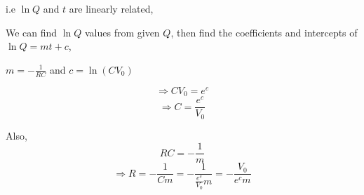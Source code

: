 \documentclass{article}
\begin{document}
i.e $\ln Q$ and $t$ are linearly related,

We can find $\ln Q$ values from given $Q$, then find the coefficients and intercepts of $\ln Q = mt + c$,

$m=-\frac{1}{RC}$ and $c= \ln(CV_0)$

\[\Rightarrow CV_0 = e^c\]
\[\Rightarrow C = \frac{e^c}{V_0}\]

Also,
\[RC=-\frac{1}{m}\]
\[\Rightarrow R=-\frac{1}{Cm}=-\frac{1}{\frac{e^c}{V_0}m}=-\frac{V_0}{e^cm}\]

\end{document}
